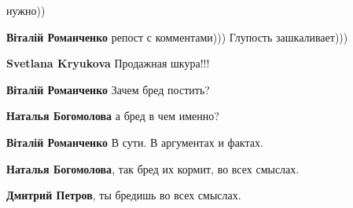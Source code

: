 \begin{itemize}
\begin{itemize}
нужно))

 
\textbf{Віталій Романченко} репост с комментами))) Глупость зашкаливает)))

 
\textbf{Svetlana Kryukova}
Продажная шкура!!!

 
\textbf{Віталій Романченко} Зачем бред постить?

 
\textbf{Наталья Богомолова} а бред в чем именно?

 
\textbf{Віталій Романченко}
В сути.
В аргументах и фактах.

 
\textbf{Наталья Богомолова}, так бред их кормит, во всех смыслах.

 
\textbf{Дмитрий Петров}, ты бредишь во всех смыслах.


\end{itemize}
\end{itemize}

